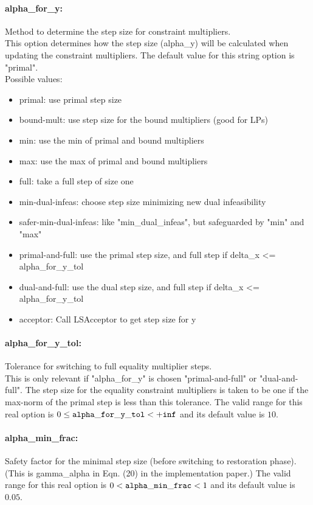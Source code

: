 \paragraph{alpha\_for\_y:}\label{sec:alpha_for_y} Method to determine the step size for constraint multipliers. $\;$ \\
 This option determines how the step size
(alpha\_y) will be calculated when updating the
constraint multipliers.
The default value for this string option is "primal".
\\ 
Possible values:
\begin{itemize}
   \item primal: use primal step size
   \item bound-mult: use step size for the bound multipliers (good
for LPs)
   \item min: use the min of primal and bound multipliers
   \item max: use the max of primal and bound multipliers
   \item full: take a full step of size one
   \item min-dual-infeas: choose step size minimizing new dual
infeasibility
   \item safer-min-dual-infeas: like "min\_dual\_infeas", but safeguarded by
"min" and "max"
   \item primal-and-full: use the primal step size, and full step if
delta\_x <= alpha\_for\_y\_tol
   \item dual-and-full: use the dual step size, and full step if
delta\_x <= alpha\_for\_y\_tol
   \item acceptor: Call LSAcceptor to get step size for y
\end{itemize}

\paragraph{alpha\_for\_y\_tol:}\label{sec:alpha_for_y_tol} Tolerance for switching to full equality multiplier steps. $\;$ \\
 This is only relevant if "alpha\_for\_y" is
chosen "primal-and-full" or "dual-and-full".  The
step size for the equality constraint multipliers
is taken to be one if the max-norm of the primal
step is less than this tolerance. The valid range for this real option is 
$0 \le {\tt alpha\_for\_y\_tol } <  {\tt +inf}$
and its default value is $10$.


\paragraph{alpha\_min\_frac:}\label{sec:alpha_min_frac} Safety factor for the minimal step size (before switching to restoration phase). $\;$ \\
 (This is gamma\_alpha in Eqn. (20) in the
implementation paper.) The valid range for this real option is 
$0 <  {\tt alpha\_min\_frac } <  1$
and its default value is $0.05$.


